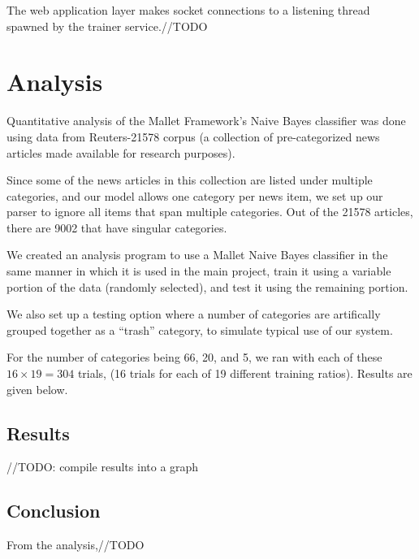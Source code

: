 \documentclass[letterpaper]{article}
\begin{document}
The web application layer makes socket connections to a listening thread spawned by the trainer service.//TODO

\section{Analysis}
Quantitative analysis of the Mallet Framework's Naive Bayes classifier was done using data from Reuters-21578 corpus \cite{Reuters21578} (a collection of pre-categorized news articles made available for research purposes).

Since some of the news articles in this collection are listed under multiple categories, and our model allows one category per news item, we set up our parser to ignore all items that span multiple categories. Out of the 21578 articles, there are 9002 that have singular categories.

We created an analysis program to use a Mallet Naive Bayes classifier in the same manner in which it is used in the main project, train it using a variable portion of the data (randomly selected), and test it using the remaining portion.

We also set up a testing option where a number of categories are artifically grouped together as a ``trash'' category, to simulate typical use of our system.

For the number of categories being 66, 20, and 5, we ran with each of these $16\times 19=304$ trials, (16 trials for each of 19 different training ratios). Results are given below.

\subsection{Results}
//TODO: compile results into a graph

\subsection{Conclusion}
From the analysis,//TODO



\end{document}
